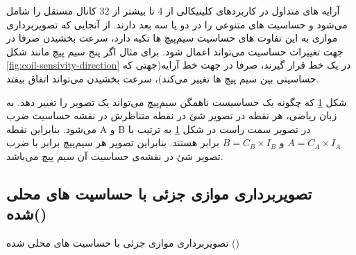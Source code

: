 آرایه های متداول در  کاربردهای کلینیکالی از 4 تا بیشتر از 32 کانال مستقل را شامل می‌شود و حساسیت های متنوعی را در دو یا سه بعد دارند. از آنجایی که تصویربرداری موازی به این تفاوت های حساسیت سیم‌پیچ ها تکیه دارد، سرعت بخشیدن صرفا در جهت تغییرات حساسیت می‌تواند اعمال شود. برای مثال اگر پنج سیم پیچ مانند شکل
 \ref{fig:coil-sensivity-direction} 
در یک خط قرار گیرند، صرفا در جهت خط آرایه(جهتی که حساسیتی بین سیم پیچ ها تغییر می‌کند)، سرعت بخشیدن می‌تواند اتفاق بیفتد. \cite{ParallelMRImaging2012}



شکل \ref{fig:coil-sensivity-product}
که چگونه یک حساسیست ناهمگن سیم‌پیچ می‌تواند یک تصویر \mr را تغییر دهد. به زبان ریاضی، هر نقطه در تصویر شئ در نقطه متناظرش در نقشه حساسیت
ضرب می‌شود. بنابراین نقطه‌ A و B در تصویر سمت راست در شکل \ref{fig:coil-sensivity-product}
به ترتیب با $A=C_A \times I_A$ و $B=C_B \times I_B$ برابر هستند. بنابراین تصویر هر سیم‌پیچ برابر با ضرب تصویر شئ در نقشه‌ی حساسیت آن سیم پیچ می‌باشد.


\begin{figure}[t!]
	\centering
	\removevspace[1]
	\caption{}
	\label{fig:coil-sensivity-product}
\end{figure}






\subsection{تصویربرداری موازی جزئی با حساسیت های محلی شده()}


تصویربرداری موازی جزئی با حساسیت های محلی شده
()

\cite{PILS-Griswold2000}

\begin{figure}
	\centering
	\removevspace[1]
	\caption{}
	\label{fig:pils-rec}
\end{figure}




